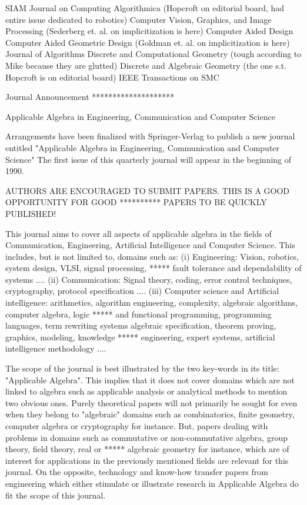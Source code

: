 SIAM Journal on Computing
Algorithmica  (Hopcroft on editorial board, had entire issue dedicated to robotics)
Computer Vision, Graphics, and Image Processing (Sederberg et. al. on implicitization 
						 is here)
Computer Aided Design
Computer Aided Geometric Design  (Goldman et. al. on implicitization is here)
Journal of Algorithms
Discrete and Computational Geometry (tough according to Mike because they are glutted)
Discrete and Algebraic Geometry (the one s.t. Hopcroft is on editorial board)
IEEE Transactions on SMC

                          Journal Announcement
                          ********************

  Applicable Algebra in Engineering, Communication and Computer Science


Arrangements have been finalized with Springer-Verlag to publish a new journal
entitled "Applicable Algebra in Engineering, Communication and Computer Science"
The first issue of this quarterly journal will appear in the beginning of 1990.

AUTHORS ARE ENCOURAGED TO SUBMIT PAPERS. THIS IS A GOOD OPPORTUNITY FOR GOOD		**********
PAPERS TO BE QUICKLY PUBLISHED!

This journal aims to cover all aspects of applicable algebra in the fields of
Communication, Engineering, Artificial Intelligence and Computer Science. This
includes, but is not limited to, domains such as:
(i)   Engineering: Vision, robotics, system design, VLSI, signal processing,		*****
      fault tolerance and dependability of systems ....
(ii)  Communication: Signal theory, coding, error control techniques,
      cryptography, protocol specification ....
(iii) Computer science and Artificial intelligence: arithmetics, algorithm
      engineering, complexity, algebraic algorithms, computer algebra, logic		*****
      and functional programming, programming languages, term rewriting systems
      algebraic specification, theorem proving, graphics, modeling, knowledge		*****
      engineering, expert systems, artificial intelligence methodology ....

The scope of the journal is best illustrated by the two key-words in its title:
"Applicable Algebra". This implies that it does not cover domains which are not
linked to algebra such as applicable analysis or analytical methods to mention
two obvious ones.
Purely theoretical papers will not primarily be sought for even when they belong
to "algebraic" domains such as combinatorics, finite geometry, computer algebra
or cryptography for instance. But, papers dealing with problems in domains such
as commutative or non-commutative algebra, group theory, field theory, real or      *****
algebraic geometry for instance, which are of interest for applications in the
previously mentioned fields are relevant for this journal.
On the opposite, technology and know-how transfer papers from engineering which
either stimulate or illustrate research in Applicable Algebra do fit the scope
of this journal.

